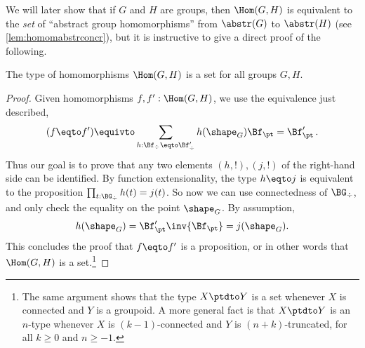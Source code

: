 We will later show that if $G$ and $H$ are groups, then $\Hom(G,H)$
is equivalent to the \emph{set} of ``abstract group homomorphisms''
from $\abstr(G)$ to $\abstr(H)$ (see \cref{lem:homomabstrconcr}),
but it is instructive to give a direct proof of the following.
\begin{lemma}\label{lem:hom-is-set}
  The type of homomorphisms $\Hom(G,H)$
  is a set for all groups $G,H$.
\end{lemma}
\begin{proof}
  Given homomorphisms $f,f':\Hom(G,H)$, we use the equivalence just
  described,
  \[
    (f \eqto f') \equivto \sum_{h:\Bf_\div\eqto\Bf'_\div}
    h(\shape_G)\Bf_\pt = \Bf'_\pt \,.
  \]
  Thus our goal is to prove that any two elements $(h,!),(j,!)$ 
  of the right-hand side can be identified.
  By function extensionality, the type $h\eqto j$ is equivalent to
  the proposition $\prod_{t:\BG_\div} h(t) = j(t)$. So now we can use
  connectedness of $\BG_\div$, and
  only check the equality on the point $\shape_G$. By assumption,
  \begin{displaymath}
    h(\shape_G) = \Bf'_\pt \inv{\Bf_\pt} = j(\shape_G).
  \end{displaymath}
  This concludes the proof that $f\eqto f'$ is a proposition, or in other
  words that $\Hom(G,H)$ is a set.\footnote{%
    \label{ft:ptd-decr-h-lev}
    The same argument shows that the type $X\ptdto Y$ is a set
    whenever $X$ is connected and $Y$ is a groupoid.
    A more general fact is that $X \ptdto Y$ is an $n$-type
    whenever $X$ is $(k-1)$-connected and $Y$ is $(n+k)$-truncated,
    for all $k\ge0$ and $n\ge-1$.}
\end{proof}

